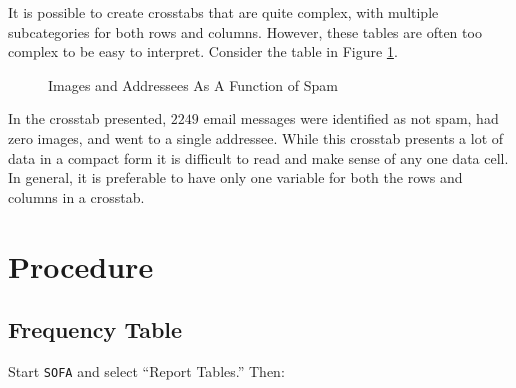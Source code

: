 It is possible to create crosstabs that are quite complex, with multiple subcategories for both rows and columns. However, these tables are often too complex to be easy to interpret. Consider the table in Figure \ref{fre:img05}.

\begin{figure}[H]
  \begin{center}
    \caption{Images and Addressees As A Function of Spam}
    \label{fre:img05}
  \end{center}
\end{figure}

In the crosstab presented, $ 2249 $ email messages were identified as not spam, had zero images, and went to a single addressee. While this crosstab presents a lot of data in a compact form it is difficult to read and make sense of any one data cell. In general, it is preferable to have only one variable for both the rows and columns in a crosstab.

\section{Procedure}

\subsection{Frequency Table}

Start \texttt{SOFA} and select ``Report Tables.'' Then:

